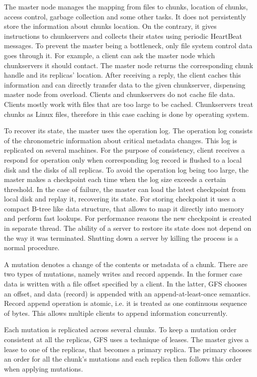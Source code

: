 The master node manages the mapping from files to chunks, location of chunks, access control, garbage collection and some other tasks.
It does not persistently store the information about chunks location. 
On the contrary, it gives instructions to chunkservers and collects their states using periodic HeartBeat messages.
To prevent the master being a bottleneck, only file system control data goes through it.
For example, a client can ask the master node which chunkservers it should contact.
The master node returns the corresponding chunk handle and its replicas' location.
After receiving a reply, the client caches this information and can directly transfer data to the given chunkserver, dispensing master node from overload.
Clients and chunkservers do not cache file data.
Clients mostly work with files that are too large to be cached.
Chunkservers treat chunks as Linux files, therefore in this case caching is done by operating system.

To recover its state, the master uses the operation log.
The operation log consists of the chronometric information about critical metadata changes.
This log is replicated on several machines.
For the purpose of consistency, client receives a respond for operation only when corresponding log record is flushed to a local disk and the disks of all replicas.
To avoid the operation log being too large, the master makes a checkpoint each time when the log size exceeds a certain threshold.
In the case of failure, the master can load the latest checkpoint from local disk and replay it, recovering its state.
For storing checkpoint it uses a compact B-tree like data structure, that allows to map it directly into memory and perform fast lookups.
For performance reasons the new checkpoint is created in separate thread.
The ability of a server to restore its state does not depend on the way it was terminated.
Shutting down a server by killing the process is a normal procedure. 

A mutation denotes a change of the contents or metadata of a chunk.
There are two types of mutations, namely writes and record appends.
In the former case data is written with a file offset specified by a client.
In the latter, GFS chooses an offset, and data (record) is appended with an append-at-least-once semantics.
Record append operation is atomic, i.e. it is treated as one continuous sequence of bytes. 
This allows multiple clients to append information concurrently.

Each mutation is replicated across several chunks.
To keep a mutation order consistent at all the replicas, GFS uses a technique of leases.
The master gives a lease to one of the replicas, that becomes a primary replica.
The primary chooses an order for all the chunk's mutations and each replica then follows this order when applying mutations.

